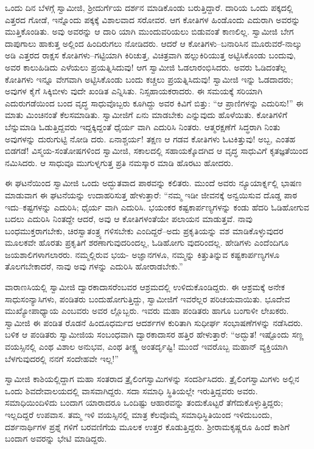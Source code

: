 ಒಂದು ದಿನ ಬೆಳಗ್ಗೆ ಸ್ವಾಮೀಜಿ, ಶ್ರೀದುರ್ಗೆಯ ದರ್ಶನ ಮಾಡಿಕೊಂಡು ಬರುತ್ತಿದ್ದಾರೆ. ದಾರಿಯ ಒಂದು ಪಕ್ಕದಲ್ಲಿ ಎತ್ತರದ ಗೋಡೆ, ಇನ್ನೊಂದು ಪಕ್ಕಕ್ಕೆ ವಿಶಾಲವಾದ ಸರೋವರ. ಆಗ ಕೋತಿಗಳ ಹಿಂಡೊಂದು ಎದುರಾಗಿ ಅವರನ್ನು ಮುತ್ತಿಕೊಂಡಿತು. ಅವು ಅವರನ್ನು ಆ ದಾರಿ ಯಾಗಿ ಮುಂದುವರಿಯಲು ಬಿಡುವಂತೆ ಕಾಣಲಿಲ್ಲ. ಸ್ವಾಮೀಜಿ ಬೇಗ ದಾಪುಗಾಲು ಹಾಕುತ್ತ ಅಲ್ಲಿಂದ ಹಿಂದಿರುಗಲು ನೋಡಿದರು. ಆದರೆ ಆ ಕೋತಿಗಳು–ಬನಾರಿಸಿನ ಮೂರುವರೆ-ನಾಲ್ಕು ಅಡಿ ಎತ್ತರದ ರಾಕ್ಷಸ ಕೋತಿಗಳು–ಗಟ್ಟಿಯಾಗಿ ಕಿರಿಚುತ್ತ, ವಿಚಿತ್ರವಾಗಿ ಹಲ್ಲುಕಿರಿಯುತ್ತ ಅಟ್ಟಿಸಿಕೊಂಡು ಬಂದುವು, ಅವರ ಕಾಲುಹಿಡಿದು ಎಳೆಯಲು ಪ್ರಯತ್ನಿಸಿದುವು! ಆಗ ಸ್ವಾಮೀಜಿ ಓಡಲಾರಂಭಿಸಿದರು. ಅವರು ಓಡಿದಂತೆಲ್ಲ ಕೋತಿಗಳು ಇನ್ನೂ ವೇಗವಾಗಿ ಅಟ್ಟಿಸಿಕೊಂಡು ಬಂದು ಕಚ್ಚಲು ಪ್ರಯತ್ನಿಸಿದುವು! ಸ್ವಾಮೀಜಿ ಇನ್ನು ಓಡದಾದರು; ಅವುಗಳ ಕೈಗೆ ಸಿಕ್ಕಿಬೀಳು ವುದೇ ಖಂಡಿತ ಎನ್ನಿಸಿತು. ನಿಸ್ಸಹಾಯಕರಾದರು. ಈ ಸಮಯಕ್ಕೆ ಸರಿಯಾಗಿ ಎದುರುಗಡೆಯಿಂದ ಬಂದ ವೃದ್ಧ ಸಾಧುವೊಬ್ಬರು ಕೂಗಿದ್ದು ಅವರ ಕಿವಿಗೆ ಬಿತ್ತು: “ಆ ಪ್ರಾಣಿಗಳನ್ನು ಎದುರಿಸು!” ಈ ಮಾತು ಮಿಂಚಿನಂತೆ ಕೆಲಸಮಾಡಿತು. ಸ್ವಾಮೀಜಿಗೆ ಏನು ಮಾಡಬೇಕು ಎನ್ನುವುದು ಹೊಳೆಯಿತು. ಕೋತಿಗಳಿಗೆ ಬೆನ್ನುಮಾಡಿ ಓಡುತ್ತಿದ್ದವರು ಇದ್ದಕ್ಕಿದ್ದಂತೆ ಧೈರ್ಯ ವಾಗಿ ಎದುರಿಸಿ ನಿಂತರು. ಆತ್ಮರಕ್ಷಣೆಗೆ ಸಿದ್ಧರಾಗಿ ನಿಂತು ಅವುಗಳನ್ನು ದುರುಗುಟ್ಟಿ ನೋಡಿ ದರು. ಏನಾಶ್ಚರ್ಯ! ತಕ್ಷಣ ಆ ಗಡವ ಕೋತಿಗಳು ಓಟಕಿತ್ತುವು! ಅಬ್ಬ, ಎಂತಹ ಬಿಡಗಡೆ! ವಿಸ್ಮಯ-ಸಂತೋಷಗಳಿಂದ ಸ್ವಾಮೀಜಿ, ಸಕಾಲದಲ್ಲಿ ಸಹಾಯಕ್ಕೊದಗಿದ ಆ ವೃದ್ಧ ಸಾಧುವಿಗೆ ಕೃತಜ್ಞತೆಯಿಂದ ನಮಿಸಿದರು. ಆ ಸಾಧುವೂ ಮುಗುಳ್ನಗುತ್ತ ಪ್ರತಿ ನಮಸ್ಕಾರ ಮಾಡಿ ಹೊರಟು ಹೋದರು.

ಈ ಘಟನೆಯಿಂದ ಸ್ವಾಮೀಜಿ ಒಂದು ಅದ್ಭುತವಾದ ಪಾಠವನ್ನು ಕಲಿತರು. ಮುಂದೆ ಅವರು ನ್ಯೂಯಾರ್ಕ್ನಲ್ಲಿ ಭಾಷಣ ಮಾಡುವಾಗ ಈ ಘಟನೆಯನ್ನು ಉದಾಹರಿಸುತ್ತ ಹೇಳುತ್ತಾರೆ: “ನಮ್ಮ ಇಡೀ ಜೀವನಕ್ಕೆ ಅನ್ವಯಿಸುವ ದೊಡ್ಡ ಪಾಠ ಇದು–ಕಷ್ಟಗಳನ್ನು ಎದುರಿಸಿ; ಧೈರ್ಯ ವಾಗಿ ಎದುರಿಸಿ. ಭಯಂಕರ ಕಷ್ಟಕಾರ್ಪಣ್ಯಗಳನ್ನು ಕಂಡು ಹೆದರಿ ಓಡಿಹೋಗುವ ಬದಲು ಎದುರಿಸಿ ನಿಂತದ್ದೇ ಆದರೆ, ಅವು ಆ ಕೋತಿಗಳಂತೆಯೇ ಪಲಾಯನ ಮಾಡುತ್ತವೆ. ನಾವು ಬಂಧಮುಕ್ತರಾಗಬೇಕು, ಚಿರಸ್ವಾತಂತ್ರ್ಯ ಗಳಿಸಬೇಕು ಎಂದಿದ್ದರೆ–ಅದು ಪ್ರಕೃತಿಯನ್ನು ವಶ ಮಾಡಿಕೊಳ್ಳುವುದರ ಮೂಲಕವೇ ಹೊರತು ಪ್ರಕೃತಿಗೆ ಶರಣಾಗುವುದರಿಂದಲ್ಲ, ಓಡಿಹೋಗು ವುದರಿಂದಲ್ಲ. ಹೇಡಿಗಳು ಎಂದೆಂದಿಗೂ ಜಯಶಾಲಿಗಳಾಗಲಾರರು. ನಮ್ಮಲ್ಲಿರುವ ಭಯ- ಅಜ್ಞಾನಗಳೂ, ನಮ್ಮನ್ನು ಕಿತ್ತುತಿನ್ನುವ ಕಷ್ಟಕಾರ್ಪಣ್ಯಗಳೂ ತೊಲಗಬೇಕಾದರೆ, ನಾವು ಅವು ಗಳನ್ನು ಎದುರಿಸಿ ಹೋರಾಡಬೇಕು.”

ವಾರಾಣಸಿಯಲ್ಲಿ ಸ್ವಾಮೀಜಿ ದ್ವಾರಕಾದಾಸರೆಂಬವರ ಆಶ್ರಮದಲ್ಲಿ ಉಳಿದುಕೊಂಡಿದ್ದರು. ಈ ಆಶ್ರಮಕ್ಕೆ ಅನೇಕ ಸಾಧುಸಂನ್ಯಾಸಿಗಳು, ಪಂಡಿತರು ಬಂದುಹೋಗುತ್ತಿದ್ದು, ಸ್ವಾಮೀಜಿಗೆ ಇವರೆಲ್ಲರ ಪರಿಚಯವಾಯಿತು. ಭೂದೇವ ಮುಖ್ಯೋಪಾಧ್ಯಾಯ ಎಂಬವರು ಅವರ ಲ್ಲೊಬ್ಬರು. ಇವರು ಮಹಾ ಪಂಡಿತರು ಹಾಗೂ ಬಂಗಾಳೀ ಲೇಖಕರು. ಸ್ವಾಮೀಜಿ ಈ ಪಂಡಿತ ರೊಡನೆ ಹಿಂದೂಧರ್ಮದ ಆದರ್ಶಗಳ ಕುರಿತಾಗಿ ಸುಧೀರ್ಘ ಸಂಭಾಷಣೆಗಳನ್ನು ನಡೆಸಿದರು. ಬಳಿಕ ಆ ಪಂಡಿತರು ಸ್ವಾಮೀಜಿಯ ಸಂಬಂಧವಾಗಿ ದ್ವಾರಕಾದಾಸರ ಹತ್ತಿರ ಹೇಳುತ್ತಾರೆ: “ಅದ್ಭುತ! ಇಷ್ಟೊಂದು ಸಣ್ಣ ವಯಸ್ಸಿನಲ್ಲಿ ಎಂಥ ವಿಶಾಲ ಅನುಭವ, ಎಂಥ ತೀಕ್ಷ್ಣ ಅಂತರ್ದೃಷ್ಟಿ! ಮುಂದೆ ಇವರೊಬ್ಬ ಮಹಾನ್ ವ್ಯಕ್ತಿಯಾಗಿ ಬೆಳಗುವುದರಲ್ಲಿ ನನಗೆ ಸಂದೇಹವೇ ಇಲ್ಲ!”

ಸ್ವಾಮೀಜಿ ಕಾಶಿಯಲ್ಲಿದ್ದಾಗ ಮಹಾ ಸಂತರಾದ ತ್ರೈಲಿಂಗಸ್ವಾಮಿಗಳನ್ನು ಸಂದರ್ಶಿಸಿದರು. ತ್ರೈಲಿಂಗಸ್ವಾಮಿಗಳು ಅಲ್ಲಿನ ಒಂದು ಶಿವದೇವಾಲಯದಲ್ಲಿ ವಾಸವಾಗಿದ್ದರು. ಸದಾ ಸಮಾಧಿ ಸ್ಥಿತಿಯಲ್ಲೇ ಇರುತ್ತಿದ್ದವರು ಅವರು. ಸಮಾಧಿಯಿಂದಿಳಿದು ಬಂದಾಗ ಯಾರಾದರೂ ಒಂದಿಷ್ಟು ಆಹಾರವನ್ನು ತಂದುಕೊಟ್ಟರೆ ತೆಗೆದುಕೊಳ್ಳುತ್ತಿದ್ದರು; ಇಲ್ಲದಿದ್ದರೆ ಉಪವಾಸ. ತಮ್ಮ ಇಳಿ ವಯಸ್ಸಿನಲ್ಲಿ ಮಾತ್ರ ಕೆಲವೊಮ್ಮೆ ಸಮಾಧಿಸ್ಥಿತಿಯಿಂದ ಇಳಿದುಬಂದು, ದರ್ಶನಾರ್ಥಿಗಳ ಪ್ರಶ್ನೆ ಗಳಿಗೆ ಬರವಣಿಗೆಯ ಮೂಲಕ ಉತ್ತರ ಕೊಡುತ್ತಿದ್ದರು. ಶ್ರೀರಾಮಕೃಷ್ಣರೂ ಹಿಂದೆ ಕಾಶಿಗೆ ಬಂದಾಗ ಅವರನ್ನು ಭೇಟಿ ಮಾಡಿದ್ದರು. 

